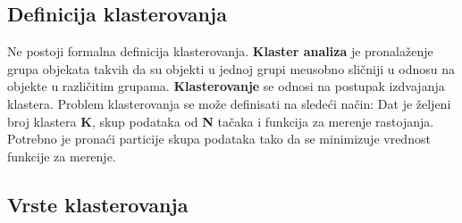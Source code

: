 \documentclass{article}
\begin{document}
\subsection{\selectfont Definicija klasterovanja}

Ne postoji formalna definicija klasterovanja. \textbf{Klaster analiza} je pronala\v{z}enje grupa objekata takvih da su objekti u jednoj grupi me\dj usobno sli\v{c}niji u odnosu na objekte u razli\v{c}itim grupama. \textbf{Klasterovanje} se odnosi na postupak izdvajanja klastera. Problem klasterovanja se mo\v{z}e definisati na slede\'{c}i na\v{c}in: Dat je \v{z}eljeni broj klastera \textbf{\selectfont K}, skup podataka od \textbf{\selectfont N} ta\v{c}aka i funkcija za merenje rastojanja. Potrebno je prona\'ci particije skupa podataka tako da se minimizuje vrednost funkcije za merenje.

\subsection{\selectfont Vrste klasterovanja}
\end{document}
